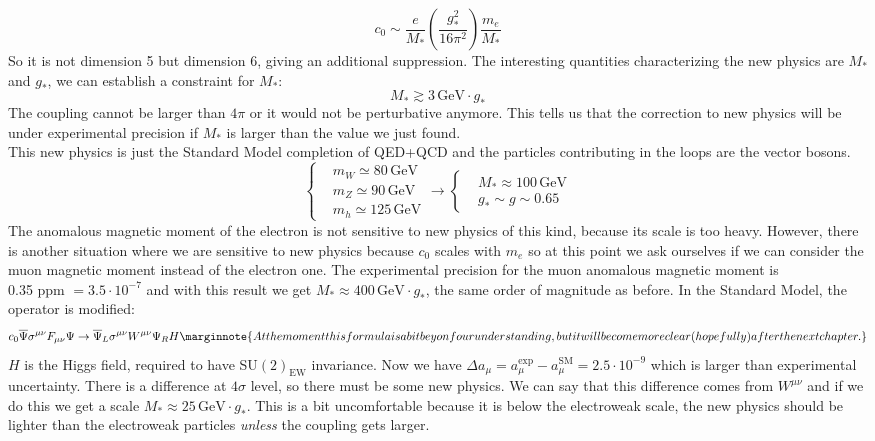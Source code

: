 \documentclass[../main.tex]{subfiles}
\begin{document}
\begin{example}
\[
c_0\sim\frac{e}{M_*}\left(\frac{g_*^2}{16\pi^2}\right)\frac{m_e}{M_*}
\]
So it is not dimension 5 but dimension 6, giving an additional suppression. The interesting quantities characterizing the new physics are $M_*$ and $g_*$, we can establish a constraint for $M_*$:
\[
M_*\gtrsim3\,\text{GeV}\cdot g_*
\]
The coupling cannot be larger than $4\pi$ or it would not be perturbative anymore. This tells us that the correction to new physics will be under experimental precision if $M_*$ is larger than the value we just found.\\
This new physics is just the Standard Model completion of QED+QCD and the particles contributing in the loops are the vector bosons.
\[
\left\{
\begin{aligned}
&m_W\simeq80\,\text{GeV}\\
&m_Z\simeq90\,\text{GeV}\\
&m_h\simeq125\,\text{GeV}
\end{aligned}
\right.
\to
\left\{
\begin{aligned}
&M_*\approx100\,\text{GeV}\\
&g_*\sim g\sim0.65
\end{aligned}
\right.
\]
The anomalous magnetic moment of the electron is not sensitive to new physics of this kind, because its scale is too heavy. However, there is another situation where we are sensitive to new physics because $c_0$ scales with $m_e$ so at this point we ask ourselves if we can consider the muon magnetic moment instead of the electron one. The experimental precision for the muon anomalous magnetic moment is\\
0.35 ppm $=3.5\cdot10^{-7}$ and with this result we get $M_*\approx400\,\text{GeV}\cdot g_*$, the same order of magnitude as before. In the Standard Model, the operator is modified:
\[
c_0\overline{\Psi}\sigma^{\mu\nu}F_{\mu\nu}\Psi\to\overline{\Psi}_L\sigma^{\mu\nu}W^{\mu\nu}\Psi_RH\marginnote{At the moment this formula is a bit beyonf our understanding, but it will become more clear (hopefully) after the next chapter.}
\]
$H$ is the Higgs field, required to have SU$(2)_{\text{EW}}$ invariance. Now we have $\Delta a_\mu=a_\mu^{\text{exp}}-a_\mu^{\text{SM}}=2.5\cdot10^{-9}$ which is larger than experimental uncertainty. There is a difference at $4\sigma$ level, so there must be some new physics. We can say that this difference comes from $W^{\mu\nu}$ and if we do this we get a scale
$M_*\approx25\,\text{GeV}\cdot g_*$. This is a bit uncomfortable because it is below the electroweak scale, the new physics should be lighter than the electroweak particles \textit{unless} the coupling gets larger.
\end{example}
\end{document}
